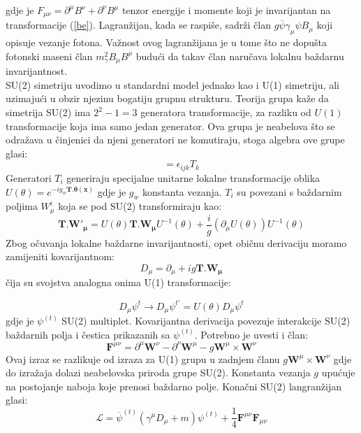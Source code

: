 \documentclass[a4paper,12pt]{report}
\begin{document}
gdje je $F_{\mu \nu}= \partial^{\mu} B^{\nu} + \partial^{\nu} B^{\mu}$ tenzor energije i momente koji je invarijantan na transformacije (\ref{be}). Lagranžijan, kada se raspiše, sadrži član $g\overline{\psi}\gamma_\mu\psi B_{\mu}$ koji opisuje vezanje fotona. Važnost ovog lagranžijana je u tome što ne dopušta fotonski maseni član $m_{\gamma}^2 B_{\mu}B^{\mu}$ budući da takav član naručava lokalnu baždarnu invarijantnost.\\

SU(2) simetriju uvodimo u standardni model jednako kao i U(1) simetriju, ali uzimajući u obzir njezinu bogatiju grupnu strukturu. Teorija grupa kaže da simetrija SU(2) ima $2^2-1=3$ generatora transformacije, za razliku od $U(1)$ transformacije koja ima samo jedan generator. Ova grupa je neabelova što se odražava u činjenici da njeni generatori ne komutiraju, stoga algebra ove grupe glasi:
\begin{equation}
[T_i,T_j]=\epsilon _{ijk} T_k
\label{komutator}
\end{equation}
Generatori $T_i$ generiraju specijalne unitarne lokalne transformacije oblika $U(\theta)=e^{-ig_w \mathbf{T}.\mathbf{\theta(x)}}$ gdje je $g_w$ konstanta vezanja. $T_i$ su povezani s baždarnim poljima $W_{\mu}^{i}$ koja se pod SU(2) transformiraju kao:
\begin{equation}
\mathbf{T.W'_{\mu}}=U(\theta)\mathbf{T.W_{\mu}}U^{-1}(\theta)+ \frac{i}{g}(\partial _{\mu}U(\theta))U^{-1}(\theta)
\label{transform}
\end{equation}
Zbog očuvanja lokalne baždarne invarijantnosti, opet običnu derivaciju moramo zamijeniti kovarijantnom:
\begin{equation}
D_{\mu}=\partial_{\mu}+ig\mathbf{T.W_{\mu}}
\label{kovarder}
\end{equation}
čija su svojstva analogna onima U(1) transformacije:

\begin{equation}
D_{\mu} \psi^{t} \rightarrow D_{\mu} \psi^{t'} = U(\theta) D_{\mu} \psi^{t} 
\label{trans}
\end{equation} 
gdje je $\psi^{(t)}$ SU(2) multiplet. Kovarijantna derivacija povezuje interakcije SU(2) baždarnih polja i čestica prikazanih sa $\psi^{(t)}$. Potrebno je uvesti i član:
\begin{equation}
\mathbf{F}^{\mu \nu}=\partial^{\mu} \mathbf{W}^{\nu}- \partial^{\nu} \mathbf{W}^{\mu}-g\mathbf{W}^{\mu}\times\mathbf{W}^{\nu}
\label{ef}
\end{equation} 
 Ovaj izraz se razlikuje od izraza za U(1) grupu u zadnjem članu $g\mathbf{W}^{\mu}\times\mathbf{W}^{\nu}$ gdje do izražaja dolazi neabelovska priroda grupe SU(2). Konstanta vezanja $g$ upućuje na postojanje naboja koje prenosi baždarno polje. Konačni SU(2) langranžijan glasi:
 \begin{equation}
\mathcal{L}=\overline{\psi}^{(t)}(\gamma^{\mu} D_{\mu}+m)\psi^{(t)} + \frac{1}{4}\mathbf{F}^{\mu \nu} \mathbf{F}_{\mu \nu}
\label{su2lagr}
\end{equation}
\end{document}
